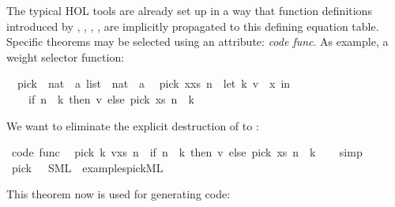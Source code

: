 \begin{isabellebody}
\begin{isamarkuptext}
  The typical HOL tools are already set up in a way that
  function definitions introduced by \isa{{\isasymDEFINITION}},
  \isa{{\isasymFUN}},
  \isa{{\isasymFUNCTION}}, \isa{{\isasymPRIMREC}},
  \isa{{\isasymRECDEF}} are implicitly propagated
  to this defining equation table. Specific theorems may be
  selected using an attribute: \emph{code func}. As example,
  a weight selector function:%
\end{isamarkuptext}%
\isamarkuptrue%
\isamarkupfalse%
\isanewline
\ \ pick\ {\isacharcolon}{\isacharcolon}\ {\isachardoublequoteopen}{\isacharparenleft}nat\ {\isasymtimes}\ {\isacharprime}a{\isacharparenright}\ list\ {\isasymRightarrow}\ nat\ {\isasymRightarrow}\ {\isacharprime}a{\isachardoublequoteclose}\isanewline
\isanewline
{}\isamarkupfalse%
\isanewline
\ \ {\isachardoublequoteopen}pick\ {\isacharparenleft}x{\isacharhash}xs{\isacharparenright}\ n\ {\isacharequal}\ {\isacharparenleft}let\ {\isacharparenleft}k{\isacharcomma}\ v{\isacharparenright}\ {\isacharequal}\ x\ in\isanewline
\ \ \ \ if\ n\ {\isacharless}\ k\ then\ v\ else\ pick\ xs\ {\isacharparenleft}n\ {\isacharminus}\ k{\isacharparenright}{\isacharparenright}{\isachardoublequoteclose}%
\begin{isamarkuptext}%
\noindent We want to eliminate the explicit destruction
  of  to :%
\end{isamarkuptext}%
\isamarkuptrue%
\isamarkupfalse%
\ {\isacharbrackleft}code\ func{\isacharbrackright}{\isacharcolon}\isanewline
\ \ {\isachardoublequoteopen}pick\ {\isacharparenleft}{\isacharparenleft}k{\isacharcomma}\ v{\isacharparenright}{\isacharhash}xs{\isacharparenright}\ n\ {\isacharequal}\ {\isacharparenleft}if\ n\ {\isacharless}\ k\ then\ v\ else\ pick\ xs\ {\isacharparenleft}n\ {\isacharminus}\ k{\isacharparenright}{\isacharparenright}{\isachardoublequoteclose}\isanewline
%
\isadelimproof
\ \ %
\endisadelimproof
%
\isatagproof
{}\isamarkupfalse%
\ simp%
\endisatagproof
{\isafoldproof}%
%
\isadelimproof
\isanewline
%
\endisadelimproof
\isanewline
{}\isamarkupfalse%
\ pick\ \ \ SML\ \ {\isachardoublequoteopen}examples{\isacharslash}pick{}{\isachardot}ML{\isachardoublequoteclose}%
\begin{isamarkuptext}%
\noindent This theorem now is used for generating code:



\end{isamarkuptext}
\end{isabellebody}
